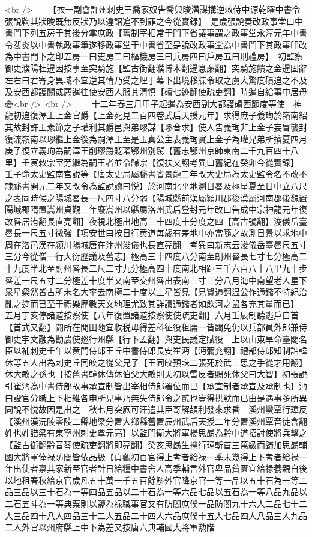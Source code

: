 <br />
　　【衣一副會許州刺史王喬家奴告喬與晙濳謀搆逆敕侍中源乾曜中書令張說鞫其狀晙既無反狀乃以違詔追不到罪之今從實録】　是歲張說奏改政事堂曰中書門下列五房于其後分掌庶政【舊制宰相常于門下省議事謂之政事堂永淳元年中書令裴炎以中書執政事筆遂移政事堂于中書省至是說改政事堂為中書門下其政事印改為中書門下之印五房一曰吏房二曰樞機房三曰兵房四曰戶房五曰刑禮房】　初監察御史濮陽杜暹因按事至突騎施【監古衘翻濮博木翻暹息亷翻】突騎施饋之金暹固辭左右曰君寄身異域不宜逆其情乃受之埋于幕下出境移牒令取之虜大驚度磧追之不及及安西都護闕或薦暹往使安西人服其清慎【磧七迹翻使疏吏翻】時暹自給事中居母憂<br />
<br />
　　十二年春三月甲子起暹為安西副大都護磧西節度等使　神龍初追復澤王上金官爵【上金死見二百四卷武后天授元年】求得庶子義珣於嶺南紹其故封許王素節之子瓘利其爵邑與弟璆謀【璆音求】使人告義珣非上金子妄冒襲封復流嶺南以璆繼上金後為嗣澤王至是玉真公主表義珣實上金子為瓘兄弟所擯夏四月庚子復立義珣為嗣澤王削璆爵貶瓘鄂州别駕【舊志鄂州京師東南二千九百四十八里】壬寅敕宗室旁繼為嗣王者並令歸宗【復扶又翻考異曰舊紀在癸卯今從實録】　壬子命太史監南宫說等【唐太史局屬秘書省景龍二年改大史局為太史監令名不改不隸祕書開元二年又改令為監說讀曰悦】於河南北平地測日晷及極星夏至日中立八尺之表同時候之陽城晷長一尺四寸八分弱【陽城縣前漢屬潁川郡後漢屬河南郡後魏置陽城郡隋置嵩州貞觀三年廢嵩州以縣屬洛州武后登封元年改曰告成中宗神龍元年復故晷居洧翻長直亮翻】夜視北極出地高三十四度十分度之四【高古號翻】浚儀岳臺晷長一尺五寸微強【項安世曰按日行黄道每歲有差地中亦當隨之故測日景以求地中周在洛邑漢在潁川陽城唐在汴州浚儀也長直亮翻　考異曰新志云浚儀岳臺晷尺五寸三分今從僧一行大衍歷議及舊志】極高三十四度八分南至朗州晷長七寸七分極高二十九度半北至蔚州晷長二尺二寸九分極高四十度南北相距三千六百八十八里九十步晷差一尺五寸二分極差十度半又南至交州晷出表南三寸三分八月海中南望老人星下衆星粲然皆古所未名大率去南極二十度以上星皆見【見賢遍翻温公作通鑑不特紀治亂之迹而已至于禮樂歷數天文地理尤致其詳讀通鑑者如飲河之鼠各充其量而已】　五月丁亥停諸道按察使【八年復置諸道按察使使疏吏翻】六月壬辰制聽逃戶自首【首式又翻】闢所在閒田隨宜收税毋得差科征役租庸一皆蠲免仍以兵部員外郎兼侍御史宇文融為勸農使廵行州縣【行下孟翻】與吏民議定賦役　上以山東旱命臺閣名臣以補刺史壬午以黄門侍郎王丘中書侍郎長安崔沔【沔彌兖翻】禮部侍郎知制誥韓休等五人出為刺史丘同皎之從父兄子【王同皎預誅二張死於武三思之手從才用翻】休大敏之孫也【按舊書韓休傳休伯父大敏則天初以雪反者賜死休父曰大智】初張說引崔沔為中書侍郎故事承宣制皆出宰相侍郎署位而已【承宣制者承宣及承制也】沔曰設官分職上下相維各申所見事乃無失侍郎令之貳也豈得拱默而已由是遇事多所異同說不悦故因是出之　秋七月突厥可汗遣其臣哥解頡利發來求昏　溪州蠻覃行璋反【溪州漢沅陵零陵二縣地梁分置大鄉縣舊置辰州武后天授二年分置溪州覃音徒含翻姓也姓譜梁有東寧州刺史覃元亮】以監門衛大將軍楊思勗為黔中道招討使將兵擊之【監古衘翻黔音琴使疏吏翻將即亮翻】癸亥思勗生擒行璋斬首三萬級而歸加思勗輔國大將軍俸禄防閤皆依品級【貞觀初百官得上考者給禄一季未幾得上下考者給禄一年出使者禀其家新至官者計日給糧中書舍人高季輔言外官卑品貧匱宜給禄養親自後以地租春秋給京官歲凡五十萬一千五百餘斛外官降京官一等一品以五十石為一等二品三品以三十石為一等四品五品以二十石為一等六品七品以五石為一等八品九品以二石五斗為一等典粟則以鹽為禄職事官又有防閤庶僕一品防閤九十六人二品七十二人三品四十八人四品三十二人五品二十四人六品庶僕十五人七品四人八品三人九品二人外官以州府縣上中下為差又按唐六典輔國大將軍勲階